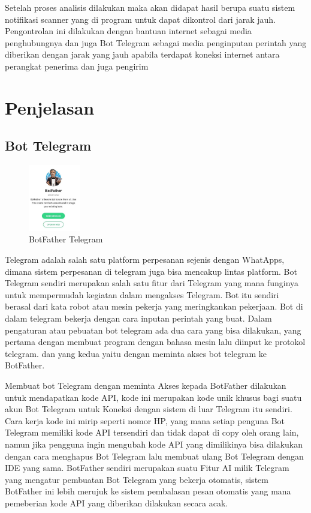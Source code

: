 \documentclass[conference]{IEEEtran}
\begin{document}
    Setelah proses analisis dilakukan maka akan didapat hasil
berupa suatu sistem notifikasi scanner yang di program untuk dapat
dikontrol dari jarak jauh. Pengontrolan ini dilakukan dengan
bantuan internet sebagai media penghubungnya dan juga Bot
Telegram sebagai media penginputan perintah yang diberikan
dengan jarak yang jauh apabila terdapat koneksi internet 
antara perangkat penerima dan juga pengirim 


\section{Penjelasan}
\subsection{Bot Telegram}
\vspace{0.2cm}
\begin{figure}[h]
    \centering
    \includegraphics[width=0.2\textwidth]{botfather-telegram.jpg}
    \caption{BotFather Telegram}
\end{figure}

    Telegram adalah salah satu platform perpesanan sejenis dengan
    WhatApps, dimana sistem perpesanan di telegram juga bisa mencakup
    lintas platform. Bot Telegram 
    sendiri merupakan salah satu fitur dari Telegram yang mana funginya untuk
    mempermudah kegiatan dalam mengakses Telegram. Bot itu sendiri
    berasal dari kata robot atau mesin pekerja yang meringkankan pekerjaan.
    Bot di dalam telegram bekerja dengan cara inputan perintah yang buat.
    Dalam pengaturan atau pebuatan bot telegram ada dua cara yang 
    bisa dilakukan, yang pertama dengan membuat program dengan bahasa
    mesin lalu diinput ke protokol telegram. dan yang kedua yaitu dengan
    meminta akses bot telegram ke BotFather.
   
    
        Membuat bot Telegram dengan meminta Akses kepada BotFather dilakukan untuk
    mendapatkan kode API, kode ini merupakan kode unik khusus bagi suatu
    akun Bot Telegram untuk Koneksi dengan sistem di luar Telegram itu
    sendiri. Cara kerja kode ini mirip seperti nomor HP, yang mana setiap
    penguna Bot Telegram memiliki kode API tersendiri dan tidak dapat di copy
    oleh orang lain, namun jika pengguna ingin mengubah kode API yang
    dimilikinya bisa dilakukan dengan cara menghapus Bot Telegram lalu
    membuat ulang Bot Telegram dengan IDE yang sama.
    BotFather sendiri merupakan suatu Fitur AI milik Telegram yang
    mengatur pembuatan Bot Telegram yang bekerja otomatis, sistem
    BotFather ini lebih merujuk ke sistem pembalasan pesan otomatis yang
    mana pemeberian kode API yang diberikan dilakukan secara acak.
\end{document}
